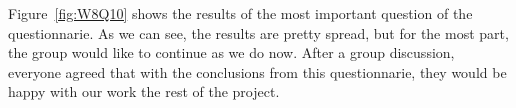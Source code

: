 Figure~\ref{fig:W8Q10} shows the results of the most important question of the questionnarie. As we can see, the results are pretty spread, but for the most part, the group would like to continue as we do now. After a group discussion, everyone agreed that with the conclusions from this questionnarie, they would be happy with our work the rest of the project. 
